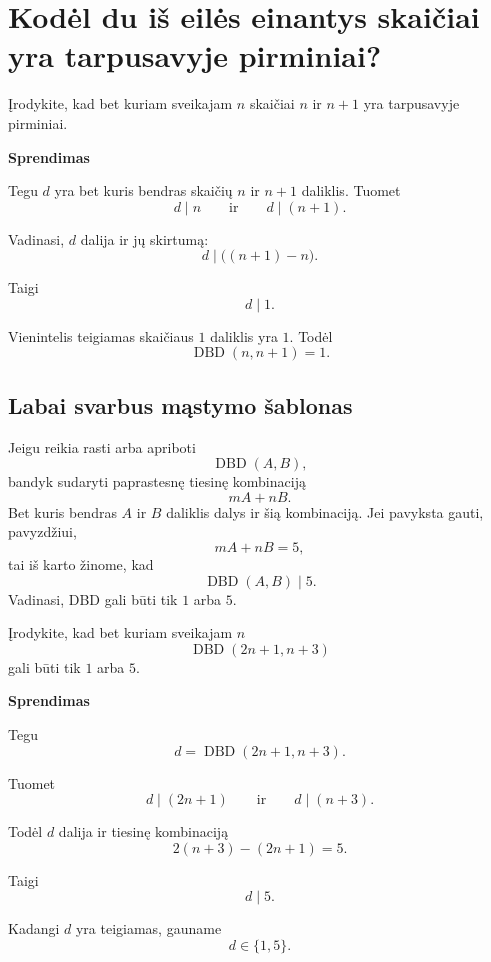 \documentclass[11pt,a4paper]{scrartcl}
\newenvironment{solution}
    {\begin{list}{}{\setlength{\leftmargin}{10pt}\setlength{\rightmargin}{10pt}}\item[]}
    {\end{list}}
\begin{document}
\section{Kodėl du iš eilės einantys skaičiai yra tarpusavyje pirminiai?}

\begin{example}

Įrodykite, kad bet kuriam sveikajam $n$ skaičiai $n$ ir $n+1$ yra
tarpusavyje pirminiai.

\end{example}

\begin{solution}
\textbf{Sprendimas}

Tegu $d$ yra bet kuris bendras skaičių $n$ ir $n+1$ daliklis.
Tuomet
\[
d\mid n
\qquad\text{ir}\qquad
d\mid(n+1).
\]

Vadinasi, $d$ dalija ir jų skirtumą:
\[
d\mid\bigl((n+1)-n\bigr).
\]

Taigi
\[
d\mid1.
\]

Vienintelis teigiamas skaičiaus $1$ daliklis yra $1$.
Todėl
\[
\boxed{\operatorname{DBD}(n,n+1)=1}.
\]

\end{solution}

\subsection{Labai svarbus mąstymo šablonas}

Jeigu reikia rasti arba apriboti
\[
\operatorname{DBD}(A,B),
\]
bandyk sudaryti paprastesnę tiesinę kombinaciją
\[
mA+nB.
\]
Bet kuris bendras $A$ ir $B$ daliklis dalys ir šią kombinaciją. Jei pavyksta gauti, pavyzdžiui,
\[
mA+nB=5,
\]
tai iš karto žinome, kad
\[
\operatorname{DBD}(A,B)\mid5.
\]
Vadinasi, DBD gali būti tik $1$ arba $5$.

\begin{example}

Įrodykite, kad bet kuriam sveikajam $n$
\[
\operatorname{DBD}(2n+1,n+3)
\]
gali būti tik $1$ arba $5$.

\end{example}

\begin{solution}
\textbf{Sprendimas}

Tegu
\[
d=\operatorname{DBD}(2n+1,n+3).
\]

Tuomet
\[
d\mid(2n+1)
\qquad\text{ir}\qquad
d\mid(n+3).
\]

Todėl $d$ dalija ir tiesinę kombinaciją
\[
2(n+3)-(2n+1)=5.
\]

Taigi
\[
d\mid5.
\]

Kadangi $d$ yra teigiamas, gauname
\[
\boxed{d\in\{1,5\}}.
\]

\end{solution}
\end{document}

